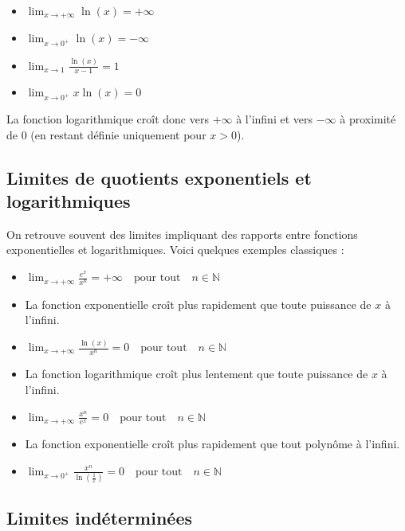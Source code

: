 \documentclass{article}
\begin{document}
\begin{itemize}
	\item \(\displaystyle \lim_{x \to +\infty} \ln(x) = +\infty \)
	\item \(\displaystyle \lim_{x \to 0^+} \ln(x) = -\infty \)
	\item \(\displaystyle \lim_{x \to 1} \frac{\ln(x)}{x - 1} = 1 \)
	\item \(\displaystyle \lim_{x \to 0^+} x \ln(x) = 0 \)
\end{itemize}

	
	La fonction logarithmique croît donc vers \( +\infty \) à l'infini et vers \( -\infty \) à proximité de 0 (en restant définie uniquement pour \( x > 0 \)).
	
	\subsection{Limites de quotients exponentiels et logarithmiques}
	
	On retrouve souvent des limites impliquant des rapports entre fonctions exponentielles et logarithmiques. Voici quelques exemples classiques :
	
\begin{itemize}
	\item \(\displaystyle \lim_{x \to +\infty} \frac{e^x}{x^n} = +\infty \quad \text{pour tout} \quad n \in \mathbb{N} \)
	\item La fonction exponentielle croît plus rapidement que toute puissance de \( x \) à l'infini.
	
	\item \(\displaystyle \lim_{x \to +\infty} \frac{\ln(x)}{x^n} = 0 \quad \text{pour tout} \quad n \in \mathbb{N} \)
	\item La fonction logarithmique croît plus lentement que toute puissance de \( x \) à l'infini.
	
	\item \(\displaystyle \lim_{x \to +\infty} \frac{x^n}{e^x} = 0 \quad \text{pour tout} \quad n \in \mathbb{N} \)
	\item La fonction exponentielle croît plus rapidement que tout polynôme à l'infini.
	
	\item \(\displaystyle \lim_{x \to 0^+} \frac{x^n}{\ln\left(\frac{1}{x}\right)} = 0 \quad \text{pour tout} \quad n \in \mathbb{N} \)
\end{itemize}

	
	\subsection{Limites indéterminées}
	
\end{document}
